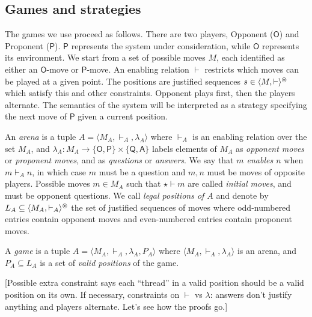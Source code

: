 \documentclass[sigplan,10pt,review,anonymous]{acmart}
\newcommand{\kw}[1]{\ensuremath{ \textsf{#1} }}
\begin{document}

\subsection{Games and strategies} %

The games we use proceed as follows.
There are two players,
Opponent (\kw{O}) and Proponent (\kw{P}).
\kw{P} represents the system under consideration,
while \kw{O} represents its environment.
We start from a set of possible moves $M$,
each identified as either an \kw{O}-move or \kw{P}-move.
An enabling relation $\vdash$ restricts which moves
can be played at a given point.
The positions are justified sequences $s \in \langle M, \vdash \rangle^\oast$
which satisfy this and other constraints.
Opponent plays first, then the players alternate.
The semantics of the system will be interpreted as a strategy
specifying the next move of \kw{P}
given a current position.

\begin{definition}[Game]
An \emph{arena} is a tuple $A = \langle M_A, \vdash_A, \lambda_A \rangle$
where $\vdash_A$ is an enabling relation over the set $M_A$, and
$\lambda_A : M_A \rightarrow \{\kw{O},\kw{P}\} \times \{\kw{Q},\kw{A}\}$
labels elements of $M_A$ as \emph{opponent moves} or \emph{proponent moves},
and as \emph{questions} or \emph{answers}.
We say that \emph{$m$ enables $n$} when $m \vdash_A n$,
in which case $m$ must be a question
and $m, n$ must be moves of opposite players.
Possible moves $m \in M_A$ such that $\star \vdash m$
are called \emph{initial moves},
and must be opponent questions.
We call \emph{legal positions of $A$}
and denote by $L_A \subseteq \langle M_A, \vdash_A \rangle^\oast$
the set of justified sequences of moves
where odd-numbered entries contain opponent moves and
even-numbered entries contain proponent moves.

A \emph{game} is a tuple $A = \langle M_A, \vdash_A, \lambda_A, P_A \rangle$
where $\langle M_A, \vdash_A, \lambda_A \rangle$ is an arena,
and $P_A \subseteq L_A$ is a set of \emph{valid positions} of the game.
\end{definition}

[Possible extra constraint says each ``thread''
in a valid position should be a valid position on its own.
If necessary, constraints on $\vdash$ vs $\lambda$:
answers don't justify anything and players alternate.
Let's see how the proofs go.]

\end{document}
